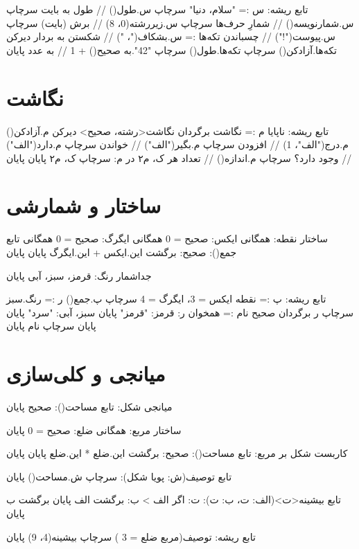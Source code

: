 \begin{salamfa}
تابع ریشه:
    س := "سلام، دنیا"
    سرچاپ س.طول()                  // طول به بایت
    سرچاپ س.شمارنویسه()            // شمارِ حرف‌ها
    سرچاپ س.زیررشته(0، 8)          // برش (بایت)
    سرچاپ س.پیوست("!")             // چسباندن
    تکه‌ها := س.بشکاف("، ")         // شکستن به بردار
    دیرکن تکه‌ها.آزادکن()
    سرچاپ تکه‌ها.طول()
    سرچاپ "42".به صحیح() + 1       // به عدد
پایان
\end{salamfa}

\section{نگاشت}

\begin{salamfa}
تابع ریشه:
    ناپایا م := نگاشت {} برگردان نگاشت<رشته، صحیح>
    دیرکن م.آزادکن()
    م.درج("الف"، 1)                // افزودن
    سرچاپ م.بگیر("الف")            // خواندن
    سرچاپ م.دارد("الف")            // وجود دارد؟
    سرچاپ م.اندازه()               // تعداد
    هر ک، م۲ در م:  سرچاپ ک، م۲  پایان
پایان
\end{salamfa}

\section{ساختار و شمارشی}

\begin{salamfa}
ساختار نقطه:
    همگانی ایکس: صحیح = 0
    همگانی ایگرگ: صحیح = 0
    همگانی تابع جمع(): صحیح: برگشت این.ایکس + این.ایگرگ پایان
پایان

جداشمار رنگ: قرمز، سبز، آبی پایان

تابع ریشه:
    پ := نقطه { ایکس = 3، ایگرگ = 4 }
    سرچاپ پ.جمع()
    ر := رنگ.سبز
    سرچاپ ر برگردان صحیح
    نام := همخوان ر:
        قرمز: "قرمز" پایان
        سبز، آبی: "سرد" پایان
    پایان
    سرچاپ نام
پایان
\end{salamfa}

\section{میانجی و کلی‌سازی}

\begin{salamfa}
میانجی شکل:
    تابع مساحت(): صحیح
پایان

ساختار مربع:
    همگانی ضلع: صحیح = 0
پایان

کاربست شکل بر مربع:
    تابع مساحت(): صحیح: برگشت این.ضلع * این.ضلع پایان
پایان

تابع توصیف(ش: پویا شکل): سرچاپ ش.مساحت() پایان

تابع بیشینه<ت>(الف: ت، ب: ت): ت:
    اگر الف > ب: برگشت الف پایان
    برگشت ب
پایان

تابع ریشه:
    توصیف(مربع { ضلع = 3 })
    سرچاپ بیشینه(4، 9)
پایان
\end{salamfa}

